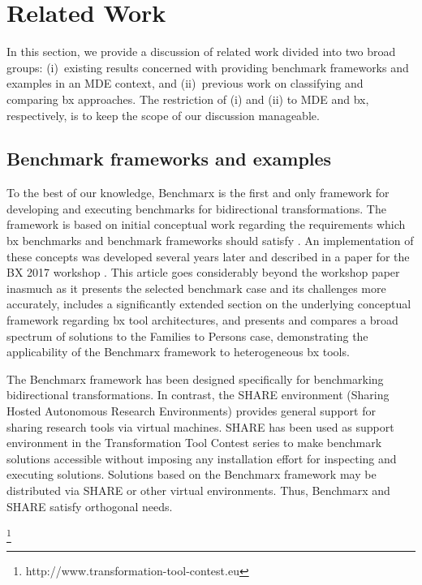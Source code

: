\section{Related Work}
\label{sec:RelatedWork}

In this section, we provide a discussion of related work divided into two broad groups:  (i)~existing results concerned with providing benchmark frameworks and examples in an MDE context, and (ii)~previous work on classifying and comparing bx approaches.
The restriction of (i) and (ii) to MDE and bx, respectively, is to keep the scope of our discussion manageable.

\subsection{Benchmark frameworks and examples}
\label{sec:BenchmarkFrameworks}

To the best of our knowledge, Benchmarx is the first and only framework for developing and executing benchmarks for bidirectional transformations. The framework is based on initial conceptual work regarding the requirements which bx benchmarks and benchmark frameworks should satisfy \cite{AnjorinCG0RS14}. An implementation of these concepts was developed several years later and described in a paper for the BX 2017 workshop \cite{Anjorin2017}. This article goes considerably beyond the workshop paper inasmuch as it presents the selected benchmark case and its challenges more accurately, includes a significantly extended section on the underlying conceptual framework regarding bx tool architectures, and presents and compares a broad spectrum of solutions to the Families to Persons case, demonstrating the applicability of the Benchmarx framework to heterogeneous bx tools. 

The Benchmarx framework has been designed specifically for benchmarking bidirectional transformations. In contrast, the SHARE environment\cite{DBLP:journals/procedia/GorpM11} (Sharing Hosted Autonomous Research Environments) provides general support for sharing research tools via virtual machines. SHARE has been used as support environment in the Transformation Tool Contest series to make benchmark solutions accessible without imposing any installation effort for inspecting and executing solutions. Solutions based on the Benchmarx framework may be distributed via SHARE or other virtual environments. Thus, Benchmarx and SHARE satisfy orthogonal needs.    

\footnote{http://www.transformation-tool-contest.eu}

